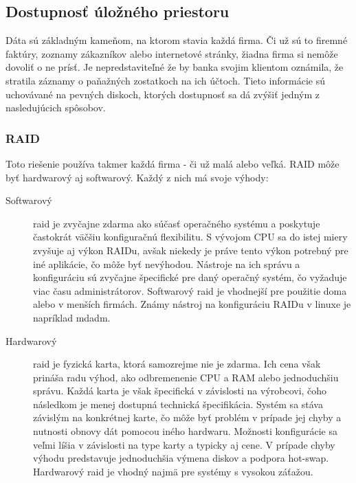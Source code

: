 \subsection{Dostupnosť úložného priestoru}
Dáta sú základným kameňom, na ktorom stavia každá firma. Či už sú to firemné faktúry, zoznamy zákazníkov alebo internetové stránky, žiadna firma si nemôže dovoliť o ne prísť. Je nepredstaviteľné že by banka svojim klientom oznámila, že stratila záznamy o paňažných zostatkoch na ich účtoch. Tieto informácie sú uchovávané na pevných diskoch, ktorých dostupnosť sa dá zvýšiť jedným z nasledujúcich spôsobov.

\subsubsection{RAID}
\label{lbl:sec:raid}
Toto riešenie používa takmer každá firma - či už malá alebo veľká. \ac{RAID} môže byť hardwarový aj softwarový. Každý z nich má svoje výhody:\cite{web:cyberciti.biz}

\begin{description}
	\item[Softwarový] raid je zvyčajne zdarma ako súčasť operačného systému a poskytuje častokrát väčšiu konfiguračnú flexibilitu. S vývojom CPU sa do istej miery zvyšuje aj výkon RAIDu, avšak niekedy je práve tento výkon potrebný pre iné aplikácie, čo môže byť nevýhodou. Nástroje na ich správu a konfiguráciu sú zvyčajne špecifické pre daný operačný systém, čo vyžaduje viac času administrátorov. Softwarový raid je vhodnejší pre použitie doma alebo v menších firmách. Známy nástroj na konfiguráciu RAIDu v linuxe je napríklad mdadm.
	\item[Hardwarový] raid je fyzická karta, ktorá samozrejme nie je zdarma. Ich cena však prináša radu výhod, ako odbremenenie CPU a RAM alebo jednoduchšiu správu. Každá karta je však špecifická v závislosti na výrobcovi, čoho následkom je menej dostupná technická špecifikácia. Systém sa stáva závislým na konkrétnej karte, čo môže byť problém v prípade jej chyby a nutnosti obnovy dát pomocou iného hardwaru. Možnosti konfigurácie sa veľmi líšia v závislosti na type karty a typicky aj cene. V prípade chyby výhodu predstavuje jednoduchšia výmena diskov a podpora hot-swap. Hardwarový raid je vhodný najmä pre systémy s vysokou záťažou.
\end{description}

